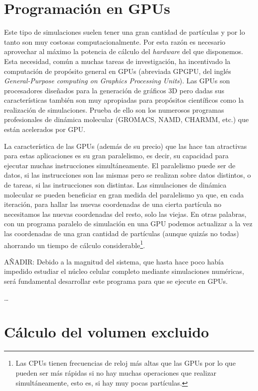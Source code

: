 \section{Programación en GPUs}

Este tipo de simulaciones suelen tener una gran cantidad de partículas y por lo tanto son muy costosas computacionalmente. Por esta razón es necesario aprovechar al máximo la potencia de cálculo del \textit{hardware} del que disponemos. Esta necesidad, común a muchas tareas de investigación, ha incentivado la computación de propósito general en GPUs (abreviada GPGPU, del inglés \textit{General-Purpose computing on Graphics Processing Units}). Las GPUs son procesadores diseñados para la generación de gráficos 3D pero dadas sus características también son muy apropiadas para propósitos científicos como la realización de simulaciones. Prueba de ello son los numerosos programas profesionales de dinámica molecular (GROMACS, NAMD, CHARMM, etc.) que están acelerados por GPU.

La característica de las GPUs (además de su precio) que las hace tan atractivas para estas aplicaciones es su gran paralelismo, es decir, su capacidad para ejecutar muchas instrucciones simultáneamente. El paralelismo puede ser de datos, si las instrucciones son las mismas pero se realizan sobre datos distintos, o de tareas, si las instrucciones son distintas. Las simulaciones de dinámica molecular se pueden beneficiar en gran medida del paralelismo ya que, en cada iteración, para hallar las nuevas coordenadas de una cierta partícula no necesitamos las nuevas coordenadas del resto, solo las viejas. En otras palabras, con un programa paralelo de simulación en una GPU podemos actualizar a la vez las coordenadas de una gran cantidad de partículas (aunque quizás no todas) ahorrando un tiempo de cálculo considerable\footnote{Las CPUs tienen frecuencias de reloj más altas que las GPUs por lo que pueden ser más rápidas si no hay muchas operaciones que realizar simultáneamente, esto es, si hay muy pocas partículas.}.

AÑADIR: Debido a la magnitud del sistema, que hasta hace poco había impedido estudiar el núcleo celular completo mediante simulaciones numéricas, será fundamental desarrollar este programa para que se ejecute en GPUs.

\cite{Wilt2013}

\dots

\section{Cálculo del volumen excluido}

